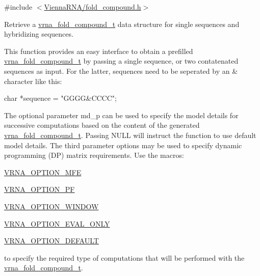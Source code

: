 {\ttfamily \#include $<$\hyperlink{fold__compound_8h}{Vienna\+R\+N\+A/fold\+\_\+compound.\+h}$>$}



Retrieve a \hyperlink{group__fold__compound_ga1b0cef17fd40466cef5968eaeeff6166}{vrna\+\_\+fold\+\_\+compound\+\_\+t} data structure for single sequences and hybridizing sequences. 

This function provides an easy interface to obtain a prefilled \hyperlink{group__fold__compound_ga1b0cef17fd40466cef5968eaeeff6166}{vrna\+\_\+fold\+\_\+compound\+\_\+t} by passing a single sequence, or two contatenated sequences as input. For the latter, sequences need to be seperated by an \textquotesingle{}\&\textquotesingle{} character like this\+:\begin{DoxyVerb}char *sequence = "GGGG&CCCC"; \end{DoxyVerb}


The optional parameter {\ttfamily md\+\_\+p} can be used to specify the model details for successive computations based on the content of the generated \hyperlink{group__fold__compound_ga1b0cef17fd40466cef5968eaeeff6166}{vrna\+\_\+fold\+\_\+compound\+\_\+t}. Passing N\+U\+LL will instruct the function to use default model details. The third parameter {\ttfamily options} may be used to specify dynamic programming (DP) matrix requirements. Use the macros\+:


\begin{DoxyItemize}
\item \hyperlink{group__fold__compound_gae63be9127fe7dcc1f9bb14f5bb1064ee}{V\+R\+N\+A\+\_\+\+O\+P\+T\+I\+O\+N\+\_\+\+M\+FE}
\item \hyperlink{group__fold__compound_gabfbadcddda3e74ce7f49035ef8f058f7}{V\+R\+N\+A\+\_\+\+O\+P\+T\+I\+O\+N\+\_\+\+PF}
\item \hyperlink{group__fold__compound_ga2b2a8009ccdccc3eb1571556261aee8e}{V\+R\+N\+A\+\_\+\+O\+P\+T\+I\+O\+N\+\_\+\+W\+I\+N\+D\+OW}
\item \hyperlink{group__fold__compound_ga61469c423131552c8483229f8b6c7e0e}{V\+R\+N\+A\+\_\+\+O\+P\+T\+I\+O\+N\+\_\+\+E\+V\+A\+L\+\_\+\+O\+N\+LY}
\item \hyperlink{group__fold__compound_gacea5b7ee6181c485f36e2afa0e9089e4}{V\+R\+N\+A\+\_\+\+O\+P\+T\+I\+O\+N\+\_\+\+D\+E\+F\+A\+U\+LT}
\end{DoxyItemize}

to specify the required type of computations that will be performed with the \hyperlink{group__fold__compound_ga1b0cef17fd40466cef5968eaeeff6166}{vrna\+\_\+fold\+\_\+compound\+\_\+t}.

